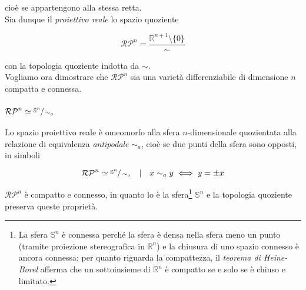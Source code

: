 cioè se appartengono alla stessa retta.\\
Sia dunque il \textit{proiettivo reale} lo spazio quoziente

\begin{equation}
	\mathcal{RP}^{n} = \dfrac{\mathbb{R}^{n+1} \setminus \{0\}}{\sim}
\end{equation}

con la topologia quoziente indotta da $ \sim $.\\
Vogliamo ora dimostrare che $ \mathcal{RP}^{n} $ sia una varietà differenziabile di dimensione $ n $ compatta e connessa.

\subsubsection{$ \mathcal{RP}^{n} \simeq \sfrac{\mathbb{S}^{n}}{\sim_{a}} $}

\begin{definition}
	Lo spazio proiettivo reale è omeomorfo alla sfera $ n $-dimensionale quozientata alla relazione di equivalenza \textit{antipodale} $ \sim_{a} $, cioè se due punti della sfera sono opposti, in simboli
	
	\begin{equation}
		\left. \mathcal{RP}^{n} \simeq \sfrac{\mathbb{S}^{n}}{\sim_{a}} \quad \middle| \quad x \sim_{a} y \iff y = \pm x \right.
	\end{equation}
\end{definition}

\begin{corollary}
	$ \mathcal{RP}^{n} $ è compatto e connesso, in quanto lo è la sfera\footnote{%
		La sfera $ \mathbb{S}^{n} $ è connessa perché la sfera è densa nella sfera meno un punto (tramite proiezione stereografica in $ \mathbb{R}^{n} $) e la chiusura di uno spazio connesso è ancora connessa; per quanto riguarda la compattezza, il \textit{teorema di Heine-Borel} afferma che un sottoinsieme di $ \mathbb{R}^{n} $ è compatto se e solo se è chiuso e limitato.%
	} $ \mathbb{S}^{n} $ e la topologia quoziente preserva queste proprietà.
\end{corollary}

